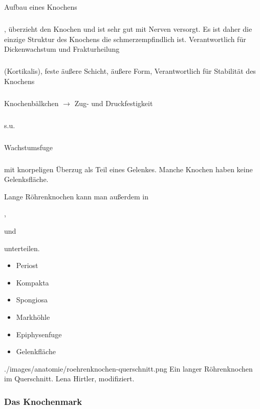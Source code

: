 
{Aufbau eines Knochens}
{

\subparagraph{} , überzieht den Knochen und
ist sehr gut mit Nerven versorgt. Es ist daher die einzige Struktur des Knochens die
schmerzempfindlich ist. Verantwortlich für Dickenwachstum und Frakturheilung
\subparagraph{} (Kortikalis),
feste äußere Schicht,
äußere Form, Verantwortlich für Stabilität des Knochens
\subparagraph{} Knochenbälkchen
${\rightarrow}$ Zug- und Druckfestigkeit
\subparagraph{} s.u.
\subparagraph{} Wachstumsfuge
\subparagraph{} mit knorpeligen Überzug als Teil eines Gelenkes.
Manche Knochen haben keine Gelenksfläche.


Lange Röhrenknochen kann man außerdem in 
\begin{inparaitem}
    \item {},
    \item {} und
    \item {} 
\end{inparaitem}
unterteilen.
}{
\begin{itemize}
  \item Periost
  \item Kompakta
  \item Spongiosa
  \item Markhöhle
  \item Epiphysenfuge
  \item Gelenkfläche
\end{itemize}
}
{./images/anatomie/roehrenknochen-querschnitt.png}
{Ein langer Röhrenknochen im Querschnitt.}
{Lena Hirtler, modifiziert.}

\subsubsection{Das Knochenmark}



